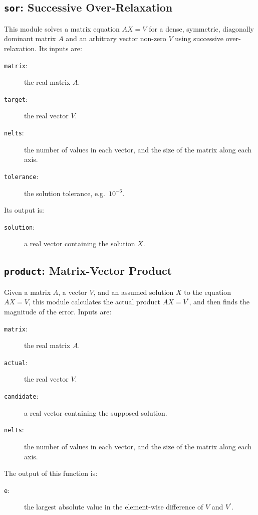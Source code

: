 \subsection{{\tt{sor}}:
	Successive Over-Relaxation
	\label{s:toys-sor}}

This module solves a matrix equation $AX=V$ for
a dense, symmetric, diagonally dominant matrix $A$
and an arbitrary vector non-zero $V$
using successive over-relaxation.
Its inputs are:
\begin{description}
\item[{\tt{matrix}}:]
	the real matrix $A$.
\item[{\tt{target}}:]
	the real vector $V$.
\item[{\tt{nelts}}:]
	the number of values in each vector, and the size of the matrix along each axis.
\item[{\tt{tolerance}}:]
	the solution tolerance, e.g.\ $10^{-6}$.
\end{description}
Its output is:
\begin{description}
\item[{\tt{solution}}:]
	a real vector containing the solution $X$.
\end{description}

\subsection{{\tt{product}}:
	Matrix-Vector Product
	\label{s:toys-product}}

Given a matrix $A$,
a vector $V$,
and an assumed solution $X$ to the equation $AX=V$,
this module calculates the actual product $AX={V^{\prime}}$,
and then finds the magnitude of the error.
Inputs are:
\begin{description}
\item[{\tt{matrix}}:]
	the real matrix $A$.
\item[{\tt{actual}}:]
	the real vector $V$.
\item[{\tt{candidate}}:]
	a real vector containing the supposed solution.
\item[{\tt{nelts}}:]
	the number of values in each vector, and the size of the matrix along each axis.
\end{description}
The output of this function is:
\begin{description}
\item[{\tt{e}}:]
	the largest absolute value in the element-wise difference of $V$ and $V^{\prime}$.
\end{description}

